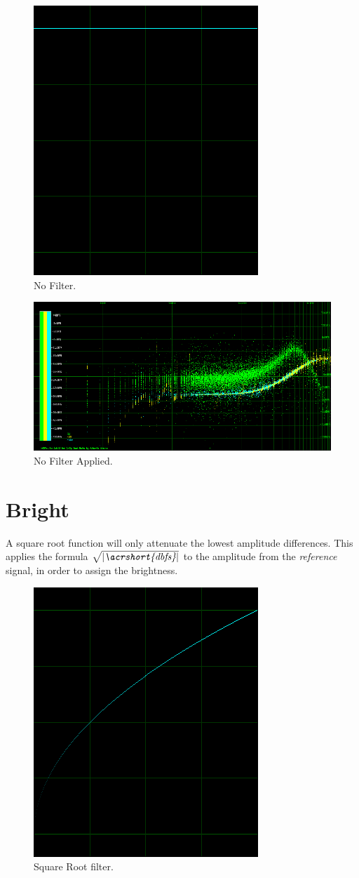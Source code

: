 \documentclass[10pt,a4paper]{report}
\newcommand{\ac}[1]{\textit{\mbox{\acrshort{#1}}}}
\newcommand{\rootdb}{$\sqrt{|\ac{dbfs}|}$}
\begin{document}
\begin{appendices}
\begin{figure}[H]
	\centering
	\includegraphics[width=0.4\linewidth]{images/colorfilter/BetaFunctionPlot_0.png}
	\caption[No Filter]{No Filter.}
	\label{fig:betafunctionplot0}
\end{figure}

\begin{figure}[H]
	\centering
	\includegraphics[width=1\linewidth]{images/colorfilter/BetaFunctionPlot_0_Data.png}
	\caption[No Filter]{No Filter Applied.}
	\label{fig:betafunctionplot0data}
\end{figure}

\section{Bright} 

A square root function will only attenuate the lowest amplitude differences. This applies the formula \rootdb{} to the amplitude from the \textit{reference} signal, in order to assign the brightness.

\begin{figure}[H]
	\centering
	\includegraphics[width=0.4\linewidth]{images/colorfilter/BetaFunctionPlot_1.png}
	\caption[Square Root filter]{Square Root filter.}
	\label{fig:betafunctionplot1}
\end{figure}


\end{appendices}
\end{document}
